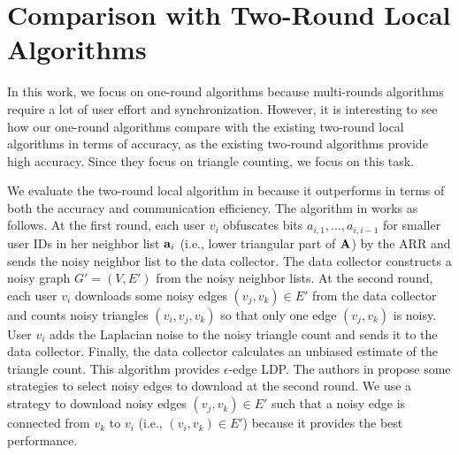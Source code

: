 \section{Comparison with Two-Round Local Algorithms}
\label{sec:two-round}
In this work, we focus on one-round algorithms because multi-rounds algorithms require a lot of user effort and synchronization.
However, it is interesting to see how our one-round algorithms compare with the existing two-round local algorithms \cite{Imola_USENIX21,Imola_USENIX22} in terms of accuracy, as the existing two-round algorithms provide high accuracy.
Since they focus on triangle counting, we focus on this task.

We evaluate the two-round local algorithm in \cite{Imola_USENIX22} because it outperforms \cite{Imola_USENIX21} in terms of both the accuracy and communication efficiency.
The algorithm in \cite{Imola_USENIX22} works as follows.
At the first round, each user $v_i$ obfuscates bits $a_{i,1}, \ldots, a_{i,i-1}$ for smaller user IDs in her neighbor list $\mathbf{a}_i$ (i.e., lower triangular part of $\mathbf{A}$) by the ARR and sends the noisy neighbor list to the data collector.
The data collector constructs a noisy graph $G'=(V,E')$ from the noisy neighbor lists.
At the second round, each user $v_i$ downloads some noisy edges $(v_j,v_k) \in E'$
from the data collector and counts noisy triangles $(v_i, v_j, v_k)$ so that
only one edge $(v_j, v_k)$ is noisy.
User $v_i$ adds the Laplacian noise to the noisy triangle count and sends it to the data collector.
Finally, the data collector calculates an unbiased estimate of the triangle count.
This algorithm provides $\epsilon$-edge LDP.
The authors in \cite{Imola_USENIX22} propose some strategies to select noisy edges to download at the second round.
We use a strategy to download noisy edges $(v_j,v_k) \in E'$ such that a noisy edge is connected from $v_k$ to $v_i$ (i.e., $(v_i,v_k) \in E'$) because it provides the best performance.

